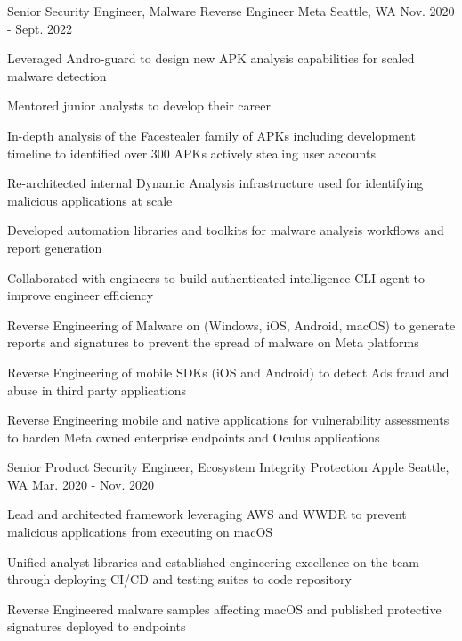 \begin{cventries}

\cventry
{Senior Security Engineer, Malware Reverse Engineer} %
{Meta} %
{Seattle, WA} %
{Nov. 2020 - Sept. 2022} %
{ %
\begin{cvitems}
    \item {Leveraged Andro-guard to design new APK analysis capabilities for scaled malware detection}
    \item {Mentored junior analysts to develop their career}
    \item {In-depth analysis of the Facestealer family of APKs including development timeline to identified over 300 APKs actively stealing user accounts}
    \item {Re-architected internal Dynamic Analysis infrastructure used for identifying malicious applications at scale}
    \item {Developed automation libraries and toolkits for malware analysis workflows and report generation}
    \item {Collaborated with engineers to build authenticated intelligence CLI agent to improve engineer efficiency}
    \item {Reverse Engineering of Malware on (Windows, iOS, Android, macOS) to generate reports and signatures to prevent the spread of malware on Meta platforms}
    \item {Reverse Engineering of mobile SDKs (iOS and Android) to detect Ads fraud and abuse in third party applications}
    \item {Reverse Engineering mobile and native applications for vulnerability assessments to harden Meta owned enterprise endpoints and Oculus applications}
\end{cvitems}
}


\cventry
{Senior Product Security Engineer, Ecosystem Integrity Protection} %
{Apple} %
{Seattle, WA} %
{Mar. 2020 - Nov. 2020} %
{ %
\begin{cvitems}
    \item {Lead and architected framework leveraging AWS and WWDR to prevent malicious applications from executing on macOS}
    \item {Unified analyst libraries and established engineering excellence on the team through deploying CI/CD and testing suites to code repository}
    \item {Reverse Engineered malware samples affecting macOS and published protective signatures deployed to endpoints}
\end{cvitems}
}


\end{cventries}
